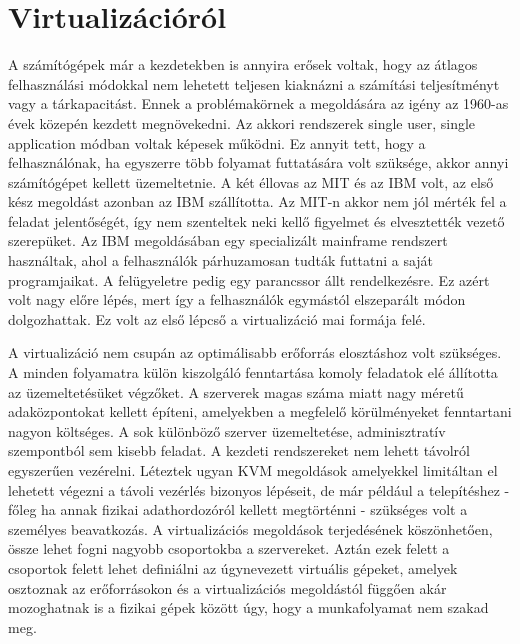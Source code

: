 \documentclass[12pt,oneside,justify]{book}
\begin{document}
 




\tableofcontents

\chapter{Virtualizációról}

A számítógépek már a kezdetekben is annyira erősek voltak, hogy az átlagos felhasználási módokkal nem lehetett teljesen kiaknázni a számítási teljesítményt vagy a tárkapacitást.
Ennek a problémakörnek a megoldására az igény az 1960-as évek közepén kezdett megnövekedni. 
Az akkori rendszerek single user, single application módban voltak képesek működni. 
Ez annyit tett, hogy a felhasználónak, ha egyszerre több folyamat futtatására volt szüksége, akkor annyi számítógépet kellett üzemeltetnie. 
A két éllovas az MIT és az IBM volt, az első kész megoldást azonban az IBM szállította. 
Az MIT-n akkor nem jól mérték fel a feladat jelentőségét, így nem szenteltek neki kellő figyelmet és elvesztették vezető szerepüket. 
Az IBM megoldásában egy specializált mainframe rendszert használtak, ahol a felhasználók párhuzamosan tudták futtatni a saját programjaikat.
A felügyeletre pedig egy parancssor állt rendelkezésre.
Ez azért volt nagy előre lépés, mert így a felhasználók egymástól elszeparált módon dolgozhattak.
Ez volt az első lépcső a virtualizáció mai formája felé.

A virtualizáció nem csupán az optimálisabb erőforrás elosztáshoz volt szükséges. 
A minden folyamatra külön kiszolgáló fenntartása komoly feladatok elé állította az üzemeltetésüket végzőket. 
A szerverek magas száma miatt nagy méretű adaközpontokat kellett építeni, amelyekben a megfelelő körülményeket fenntartani nagyon költséges. 
A sok különböző szerver üzemeltetése, adminisztratív szempontból sem kisebb feladat. 
A kezdeti rendszereket nem lehett távolról egyszerűen vezérelni. Léteztek ugyan KVM megoldások amelyekkel limitáltan el lehetett végezni a távoli vezérlés bizonyos lépéseit, de már például a telepítéshez - főleg ha annak fizikai adathordozóról kellett megtörténni - szükséges volt a személyes beavatkozás. 
A virtualizációs megoldások terjedésének köszönhetően, össze lehet fogni nagyobb csoportokba a szervereket. 
Aztán ezek felett a csoportok felett lehet definiálni az úgynevezett virtuális gépeket, amelyek osztoznak az erőforrásokon és a virtualizációs megoldástól függően akár mozoghatnak is a fizikai gépek között úgy, hogy a munkafolyamat nem szakad meg.
\end{document}
